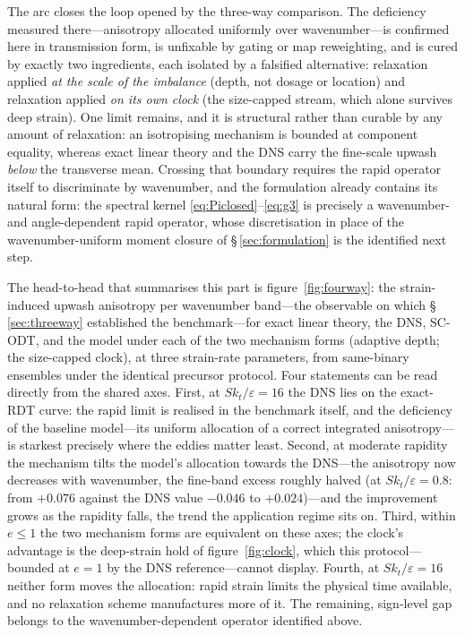 \documentclass[11pt,a4paper]{article}
\begin{document}
The arc closes the loop opened by the three-way comparison. The
deficiency measured there---anisotropy allocated uniformly over
wavenumber---is confirmed here in transmission form, is unfixable by
gating or map reweighting, and is cured by exactly two ingredients,
each isolated by a falsified alternative: relaxation applied \emph{at
the scale of the imbalance} (depth, not dosage or location) and
relaxation applied \emph{on its own clock} (the size-capped stream,
which alone survives deep strain). One limit remains, and it is
structural rather than curable by any amount of relaxation: an
isotropising mechanism is bounded at component equality, whereas exact
linear theory and the DNS carry the fine-scale upwash \emph{below} the
transverse mean. Crossing that boundary requires the rapid operator
itself to discriminate by wavenumber, and the formulation already
contains its natural form: the spectral kernel
\eqref{eq:Piclosed}--\eqref{eq:g3} is precisely a wavenumber- and
angle-dependent rapid operator, whose discretisation in place of the
wavenumber-uniform moment closure of \S\,\ref{sec:formulation} is the
identified next step.

The head-to-head that summarises this part is
figure~\ref{fig:fourway}: the strain-induced upwash anisotropy per
wavenumber band---the observable on which \S\,\ref{sec:threeway}
established the benchmark---for exact linear theory, the DNS, SC-ODT,
and the model under each of the two mechanism
forms (adaptive depth; the size-capped clock), at three strain-rate
parameters, from same-binary ensembles under the identical precursor
protocol. Four statements can be read directly from the shared axes.
First, at $Sk_t/\varepsilon=16$ the DNS lies on the exact-RDT curve:
the rapid limit is realised in the benchmark itself, and the
deficiency of the baseline model---its uniform allocation of a correct
integrated anisotropy---is starkest precisely where the eddies matter
least. Second, at moderate rapidity the mechanism tilts the model's
allocation towards the DNS---the anisotropy now decreases with
wavenumber, the fine-band excess roughly halved (at
$Sk_t/\varepsilon=0.8$: from $+0.076$ against the DNS value $-0.046$
to $+0.024$)---and the improvement grows as the rapidity falls, the
trend the application regime sits on. Third, within $e\le1$ the two
mechanism forms are equivalent on these axes; the clock's advantage is
the deep-strain hold of figure~\ref{fig:clock}, which this
protocol---bounded at $e=1$ by the DNS reference---cannot display.
Fourth, at $Sk_t/\varepsilon=16$ neither form moves the allocation:
rapid strain limits the physical time available, and no relaxation
scheme manufactures more of it. The remaining, sign-level gap belongs
to the wavenumber-dependent operator identified above.
\end{document}
